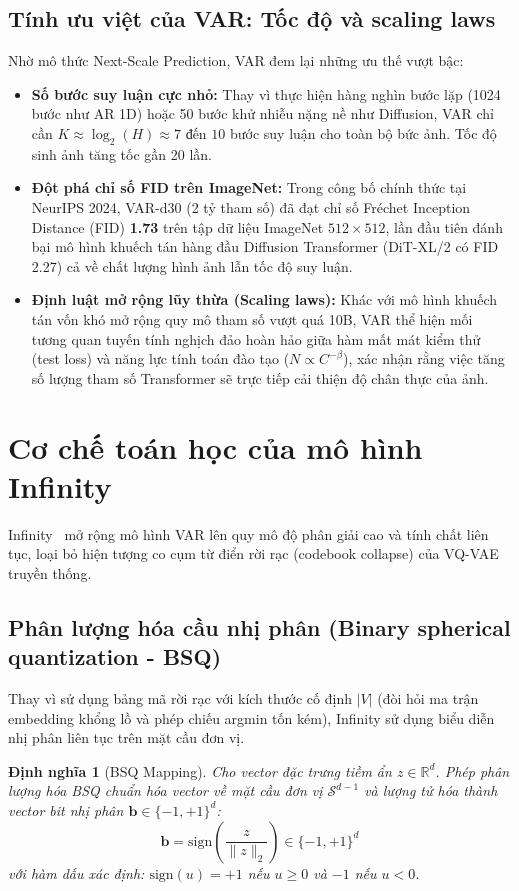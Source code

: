 \documentclass[10pt,twocolumn,letterpaper]{article}
\newtheorem{definition}{Định nghĩa}
\begin{document}
\subsection{Tính ưu việt của VAR: Tốc độ và scaling laws}
Nhờ mô thức Next-Scale Prediction, VAR đem lại những ưu thế vượt bậc:
\begin{itemize}
    \item \textbf{Số bước suy luận cực nhỏ:} Thay vì thực hiện hàng nghìn bước lặp (1024 bước như AR 1D) hoặc 50 bước khử nhiễu nặng nề như Diffusion, VAR chỉ cần $K \approx \log_2(H) \approx 7 \text{ đến } 10$ bước suy luận cho toàn bộ bức ảnh. Tốc độ sinh ảnh tăng tốc gần 20 lần.
    \item \textbf{Đột phá chỉ số FID trên ImageNet:} Trong công bố chính thức tại NeurIPS 2024, VAR-d30 (2 tỷ tham số) đã đạt chỉ số Fréchet Inception Distance (FID) \textbf{1.73} trên tập dữ liệu ImageNet $512 \times 512$, lần đầu tiên đánh bại mô hình khuếch tán hàng đầu Diffusion Transformer (DiT-XL/2 có FID 2.27) cả về chất lượng hình ảnh lẫn tốc độ suy luận.
    \item \textbf{Định luật mở rộng lũy thừa (Scaling laws):} Khác với mô hình khuếch tán vốn khó mở rộng quy mô tham số vượt quá 10B, VAR thể hiện mối tương quan tuyến tính nghịch đảo hoàn hảo giữa hàm mất mát kiểm thử (test loss) và năng lực tính toán đào tạo ($N \propto C^{-\beta}$), xác nhận rằng việc tăng số lượng tham số Transformer sẽ trực tiếp cải thiện độ chân thực của ảnh.
\end{itemize}

\section{Cơ chế toán học của mô hình Infinity}
\label{sec:infinity}

Infinity~\cite{han2025infinity} mở rộng mô hình VAR lên quy mô độ phân giải cao và tính chất liên tục, loại bỏ hiện tượng co cụm từ điển rời rạc (codebook collapse) của VQ-VAE truyền thống.

\subsection{Phân lượng hóa cầu nhị phân (Binary spherical quantization - BSQ)}
Thay vì sử dụng bảng mã rời rạc với kích thước cố định $|V|$ (đòi hỏi ma trận embedding khổng lồ và phép chiếu argmin tốn kém), Infinity sử dụng biểu diễn nhị phân liên tục trên mặt cầu đơn vị.

\begin{definition}[BSQ Mapping]
Cho vector đặc trưng tiềm ẩn $z \in \mathbb{R}^d$. Phép phân lượng hóa BSQ chuẩn hóa vector về mặt cầu đơn vị $\mathcal{S}^{d-1}$ và lượng tử hóa thành vector bit nhị phân $\mathbf{b} \in \{-1, +1\}^d$:
\begin{equation}
\mathbf{b} = \text{sign}\left(\frac{z}{\|z\|_2}\right) \in \{-1, +1\}^d
\end{equation}
với hàm dấu xác định: $\text{sign}(u) = +1$ nếu $u \ge 0$ và $-1$ nếu $u < 0$.
\end{definition}
\end{document}
